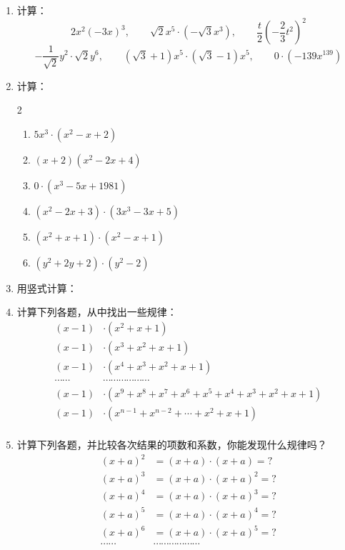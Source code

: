 \begin{ex}
\begin{enumerate}
    \item 计算：
    \[2x^2(-3x)^3,\qquad \sqrt{2}x^5\cdot (-\sqrt{3}x^3),\qquad \frac{t}{2}\left(-\frac{2}{3}t^2\right)^2 \]
    \[-\frac{1}{\sqrt{2}}y^2\cdot \sqrt{2}y^6,\qquad (\sqrt{3}+1)x^5\cdot (\sqrt{3}-1)x^5,\qquad 0\cdot (-139x^{139}) \]
    \item 计算：
    \begin{multicols}{2}
    \begin{enumerate}
        \item $5x^3\cdot (x^2-x+2)$
        \item $(x+2)(x^2-2x+4)$
        \item $0\cdot (x^3-5x+1981)$
        \item $(x^2-2x+3)\cdot (3x^3-3x+5)$
        \item $(x^2+x+1)\cdot (x^2-x+1)$
        \item $(y^2+2y+2)\cdot(y^2-2)$
    \end{enumerate}
    \end{multicols}
    \item 用竖式计算：
\begin{enumerate}
\end{enumerate}
\item 计算下列各题，从中找出一些规律：
\[\begin{split}
    (x-1)&\cdot (x^2+x+1)\\
    (x-1)&\cdot (x^3+x^2+x+1)\\
    (x-1)&\cdot (x^4+x^3+x^2+x+1)\\
    \cdots\cdots & \cdots\cdots \cdots\cdots \cdots\cdots \\
    (x-1)&\cdot (x^9+x^8+x^7+x^6+x^5+x^4+x^3+x^2+x+1)\\
    (x-1)&\cdot (x^{n-1}+x^{n-2}+\cdots+x^2+x+1)\\
\end{split}\]

\item 计算下列各题，并比较各次结果的项数和系数，你能发现什么规律吗？
\[\begin{split}
    (x+a)^2&=(x+a)\cdot (x+a)=?\\
    (x+a)^3&=(x+a)\cdot (x+a)^2=?\\
    (x+a)^4&=(x+a)\cdot (x+a)^3=?\\
    (x+a)^5&=(x+a)\cdot (x+a)^4=?\\
    (x+a)^6&=(x+a)\cdot (x+a)^5=?\\
\cdots\cdots &\cdots\cdots \cdots\cdots \cdots\cdots \\
\end{split}\]
\end{enumerate}
\end{ex}

